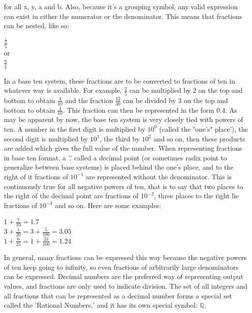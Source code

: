 for all x, y, a and b. Also, because it's a grouping symbol, any valid expression can exist in either the numerator or the denominator. This means that fractions can be nested, like so:
\begin{center}
$\frac{\frac{1}{3}}{5}$ \\
or \\
$\frac{a}{\frac{b}{c}}$
\end{center}
In a base ten system, these fractions are to be converted to fractions of ten in whatever way is available. For example, $\frac{2}{5}$ can be multiplied by $2$ on the top and bottom to obtain $\frac{4}{10}$ and the fraction $\frac{12}{30}$ can be divided by $3$ on the top and bottom to obtain $\frac{4}{10}$. This fraction can then be represented in the form $0.4$. As may be apparent by now, the base ten system is very closely tied with powers of ten. A number in the first digit is multiplied by $10^0$ (called the "one's" place'), the second digit is multiplied by $10^1$, the third by $10^2$ and so on, then these products are added which gives the full value of the number. When representing fractions in base ten format, a '.' called a decimal point (or sometimes radix point to generalize between base systems) is placed behind the one's place, and to the right of it fractions of $10^{-1}$ are represented without the denominator. This is continuously true for all negative powers of ten, that is to say that two places to the right of the decimal point are fractions of $10^{-2}$, three places to the right lie fractions of $10^{-3}$ and so on. Here are some examples:
\begin{center}
$1+\frac{7}{10}=1.7$ \\
$3+\frac{1}{20}=3+\frac{5}{100}=3.05$ \\
$1+\frac{6}{25}=1+\frac{24}{100}=1.24$ \\
\end{center}
In general, many fractions can be expressed this way because the negative powers of ten keep going to infinity, so even fractions of arbitrarily large denominators can be expressed. Decimal numbers are the preferred way of representing output values, and fractions are only used to indicate division. The set of all integers and all fractions that can be represented as a decimal number forms a special set called the 'Rational Numbers,' and it has its own special symbol: $\mathbb{Q}$.


